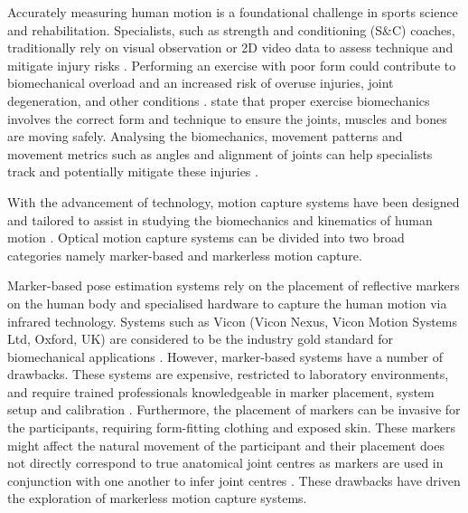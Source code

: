 
\label{chap:introduction}

\label{Background}
Accurately measuring human motion is a foundational challenge in sports science and rehabilitation. Specialists, such as strength and conditioning (S\&C) coaches, traditionally rely on visual observation or 2D video data to assess technique and mitigate injury risks \cite{needham2021accuracy, chariar2023ai, forte2023biomechanics}.
Performing an exercise with poor form could contribute to biomechanical overload and an increased risk of overuse injuries, joint degeneration, and other conditions \cite{chariar2023ai}. \citet{forte2023biomechanics} state that proper exercise biomechanics involves the correct form and technique to ensure the joints, muscles and bones are moving safely. 
Analysing the biomechanics, movement patterns and movement metrics such as angles and alignment of joints can help specialists track and potentially mitigate these injuries \cite{forte2023biomechanics}.

With the advancement of technology, motion capture systems have been designed and tailored to assist in studying the biomechanics and kinematics of human motion \cite{colyer2018review, mundermann2006evolution}.
Optical motion capture systems can be divided into two broad categories namely marker-based and markerless motion capture.

Marker-based pose estimation systems rely on the placement of reflective markers on the human body and specialised hardware to capture the human
motion via infrared technology. Systems such as Vicon (Vicon Nexus, Vicon Motion Systems Ltd, Oxford, UK) are considered to be the industry gold standard for biomechanical applications \cite{matsuda2025reliability, hansen2024validation, song2022evolution}. However, marker-based systems have a number of drawbacks. These systems are expensive, restricted to laboratory environments, and require trained professionals knowledgeable in marker placement, system setup and calibration \cite{mercadal2024exercise,kuster2016accuracy}. Furthermore, the placement of markers can be invasive for the participants, requiring form-fitting clothing and exposed skin. These markers might affect the natural movement of the participant and their placement does not directly correspond to true anatomical joint centres as markers are used in conjunction with one another to infer joint centres \cite{needham2021accuracy}.   
These drawbacks have driven the exploration of markerless motion capture systems. 

